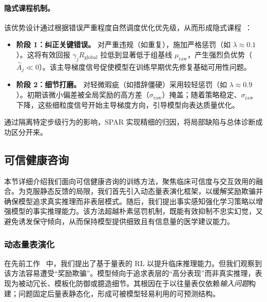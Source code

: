 
\paragraph{隐式课程机制。}
该优势设计通过根据错误严重程度自然调度优化优先级，从而形成隐式课程~\cite{bengio2009curriculum}：
\begin{itemize}
    \item \textbf{阶段 1：纠正关键错误。} 对严重违规（如重复），施加严格惩罚（如 $\lambda \approx 0.1$）。这将有效回报 $\gamma_j R_{\text{global}}$ 拉低到显著低于组基线 $\mu_{\text{raw}}$，产生强烈负优势（$\hat{A}_j \ll 0$）。该主导梯度信号促使模型在训练早期优先修复基础可用性问题。
    \item \textbf{阶段 2：细节打磨。} 对轻微瑕疵（如措辞僵硬）采用较轻惩罚（如 $\lambda \approx 0.9$）。初期该微小偏差被全局奖励的高方差（$\sigma_{\text{raw}}$）掩盖；随着策略稳定、$\sigma_{\text{raw}}$ 下降，这些细粒度信号开始主导梯度方向，引导模型向表达质量优化。
\end{itemize}
通过隔离特定步级行为的影响，SPAR 实现精细的归因，将局部缺陷与总体诊断成功区分开来。


\subsection{可信健康咨询}
本节详细介绍我们面向可信健康咨询的训练方法，聚焦临床可信度与交互效用的融合。为克服静态反馈的局限，我们首先引入动态量表演化框架，以缓解奖励欺骗并确保模型追求真实推理而非表层模式。随后，我们提出事实感知强化学习策略以增强模型的事实推理能力。该方法超越朴素惩罚机制，既能有效抑制不忠实幻觉，又避免诱发保守倾向，从而保持模型提供细致且有信息量的医学建议能力。

\subsubsection{动态量表演化}
在先前工作~\cite{baichuan-m2} 中，我们提出了基于量表的 RL 以提升临床推理能力。但我们观察到该方法容易遭受“奖励欺骗”。模型倾向于追求表层的“高分表现”而非真实推理，表现为被动冗长、模板化防御或臆造细节。其根因在于以往量表仅依赖\textit{输入问题}构建；问题固定后量表静态化，形成可被模型轻易利用的可预测结构。


